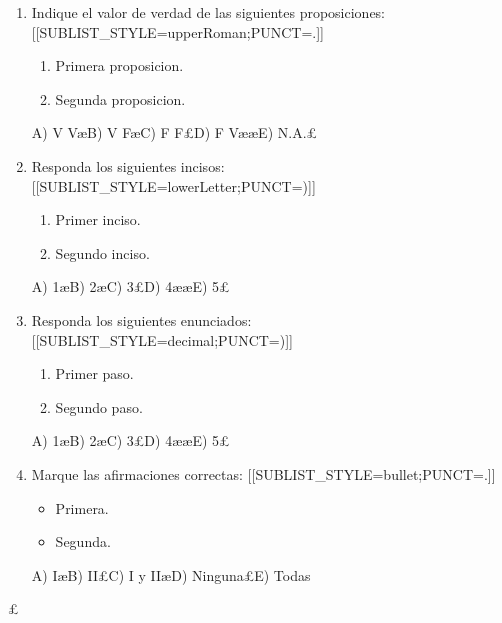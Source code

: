 \begin{enumerate}
\item[\textbf{1.}] Indique el valor de verdad de las siguientes proposiciones: [[SUBLIST_STYLE=upperRoman;PUNCT=.]]
\begin{enumerate}
\item Primera proposicion.
\item Segunda proposicion.
\end{enumerate}
A) V VæB) V FæC) F F£D) F VææE) N.A.£\item[\textbf{2.}] Responda los siguientes incisos: [[SUBLIST_STYLE=lowerLetter;PUNCT=)]]
\begin{enumerate}
\item Primer inciso.
\item Segundo inciso.
\end{enumerate}
A) 1æB) 2æC) 3£D) 4ææE) 5£\item[\textbf{3.}] Responda los siguientes enunciados: [[SUBLIST_STYLE=decimal;PUNCT=)]]
\begin{enumerate}
\item Primer paso.
\item Segundo paso.
\end{enumerate}
A) 1æB) 2æC) 3£D) 4ææE) 5£\item[\textbf{4.}] Marque las afirmaciones correctas: [[SUBLIST_STYLE=bullet;PUNCT=.]]
\begin{itemize}
\item Primera.
\item Segunda.
\end{itemize}
A) IæB) II£C) I y IIæD) Ninguna£E) Todas
\end{enumerate}£